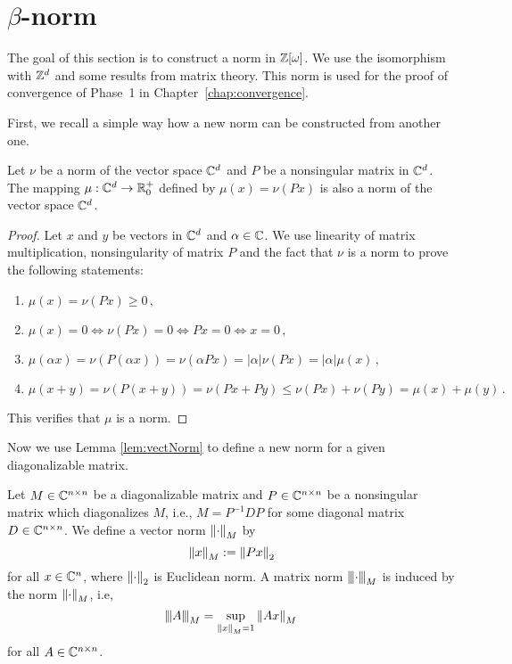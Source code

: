\section{$\beta$-norm}
The goal of this section is to construct a norm in $\mathbb{Z}[\omega]$. We use the isomorphism with $\mathbb{Z}^d$ and some results from matrix theory. This norm is used for the proof of convergence of Phase~1 in Chapter~\ref{chap:convergence}.

First, we recall a simple way how a new norm can be constructed from another one.

\begin{lem}
\label{lem:vectNorm}
Let $\nu$ be a norm of the vector space $\mathbb{C}^d$ and $P$ be a nonsingular matrix in $\mathbb{C}^d$. The mapping $\mu:\mathbb{C}^d\rightarrow \mathbb{R}^+_0$ defined by $\mu(x)=\nu(Px)$ is also a norm of the vector space $\mathbb{C}^d$.
\end{lem}
\begin{proof}
Let $x$ and $y$ be vectors in $\mathbb{C}^d$ and $\alpha\in \mathbb{C}$.  We use linearity of matrix multiplication, nonsingularity of matrix $P$ and the fact that $\nu$ is a norm to prove the following statements:
\begin{enumerate}
    \item $\mu(x)=\nu(Px)\geq 0\,,$
    \item $\mu(x)=0 \iff \nu(Px)=0 \iff Px=0 \iff x=0\,,$
    \item $\mu(\alpha x)=\nu(P(\alpha x))=\nu(\alpha Px)=|\alpha|\nu(Px)=|\alpha|\mu(x)\,,$
    \item $\mu(x+y)=\nu(P(x+y))=\nu(Px+Py)\leq \nu(Px)+\nu(Py)=\mu(x)+\mu(y)\,.$
\end{enumerate}
This  verifies that $\mu$ is a norm.
\end{proof}


Now we use Lemma \ref{lem:vectNorm} to define a new norm for a given diagonalizable matrix.
\begin{defn}
\label{def:newNorm}
Let $M\in\mathbb{C}^{n\times n}$ be a diagonalizable matrix and $P\in\mathbb{C}^{n\times n}$ be a nonsingular matrix which diagonalizes $M$, i.e., $M=P^{-1}DP$ for some diagonal matrix $D\in\mathbb{C}^{n\times n}$. We define a vector norm $\left\lVert\cdot\right\rVert_{M}$ by  
\begin{equation}
\left\lVert x\right\rVert_{M}:=\left\lVert Px\right\rVert_{2}
\end{equation}
for all $x\in\mathbb{C}^n$, where $\left\lVert\cdot\right\rVert_{2}$ is Euclidean norm. A matrix norm ${\left\vert\kern-0.25ex\left\vert\kern-0.25ex\left\vert \cdot\right\vert\kern-0.25ex\right\vert\kern-0.25ex\right\vert}_{M}$ is induced by the norm $\left\lVert\cdot\right\rVert_{M}$, i.e, 
$$
{\left\vert\kern-0.25ex\left\vert\kern-0.25ex\left\vert A\right\vert\kern-0.25ex\right\vert\kern-0.25ex\right\vert}_{M}=\sup_{\left\lVert x\right\rVert_{M}=1} \left\lVert Ax\right\rVert_{M}\,
$$
for all $A\in\mathbb{C}^{n\times n}$.
\end{defn}

